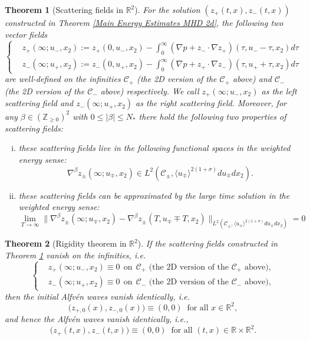 \documentclass[10pt,reqno]{amsart}
\numberwithin{equation}{section}
\newtheorem{theorem}{Theorem}[section]
\begin{document}
\begin{appendix}
	
	\begin{theorem}[Scattering fields in $\mathbb{R}^2$]\label{futurescatteringfields MHD 2d}
		For the solution $\left(z_+(t,x),z_-(t,x)\right)$ constructed in Theorem \ref{Main Energy Estimates MHD 2d}, the following two vector fields
		\begin{equation}\label{eq:def-sca4}
			\begin{cases}
				&\displaystyle z_+(\infty;u_-,x_2):=z_+(0,u_-,x_2)-\int_0^{\infty} \left(\nabla p+z_{-}\cdot\nabla z_{+}\right)(\tau,u_--\tau,x_2)d\tau\\
				&\displaystyle z_-(\infty;u_+,x_2):=z_-(0,u_+,x_2)-\int_0^{\infty} \left(\nabla p+z_{+}\cdot\nabla z_{-}\right)(\tau,u_++\tau,x_2)d\tau
			\end{cases}
		\end{equation}
		are well-defined on the infinities   $\mathcal{C}_+$  (the 2D version of the $\mathcal{C}_+$ above) and $\mathcal{C}_-$ (the 2D version of the  $\mathcal{C}_-$ above) respectively. We call  $z_+(\infty;u_-,x_2)$ as the left scattering field and $z_-(\infty;u_+,x_2)$ as the right  scattering field. Moreover, for any $\beta\in(\mathbb{Z}_{\geqslant 0})^2$ with $0\leqslant |\beta|\leqslant N_*$ there hold the following two properties of scattering fields:
		\begin{enumerate}[(i)]
	\item these scattering fields live in the following functional spaces in the weighted energy sense:
	\[\nabla^\beta z_\pm(\infty;u_\mp,x_2)\in L^2(\mathcal{C}_\pm,\langle u_\mp\rangle^{2(1+\sigma)}du_\mp dx_2).\]
	\item these scattering fields can be approximated by the large time solution in the weighted energy sense:
	\[\lim_{T\to\infty}\Big\|\nabla^{\beta} z_{\pm}(\infty;u_\mp,x_2)-\nabla^\beta z_{\pm}(T,u_\mp\mp T,x_2)\Big\|_{L^2(\mathcal{C}_\pm,\langle u_\mp\rangle^{2(1+\sigma)}du_\mp dx_2)}=0\]
		\end{enumerate}
	\end{theorem}
	
	
	
	
	\begin{theorem}[Rigidity theorem in $\mathbb{R}^2$]\label{rigidity theorem 1 2d}
		If the scattering fields  constructed in Theorem \ref{futurescatteringfields MHD 2d} vanish on the  infinities, i.e. 
		\begin{equation*}
			\begin{cases}
				& z_+(\infty;u_-,x_2)\equiv 0\ \ \text{on} \ \ \mathcal{C}_+\text{ (the 2D version of the  $\mathcal{C}_+$ above)},\\
				& z_-(\infty;u_+,x_2)\equiv 0\ \ \text{on} \ \ \mathcal{C}_-\text{ (the 2D version of the  $\mathcal{C}_-$ above)},
			\end{cases}
		\end{equation*}	
	then the initial Alfv\'en waves vanish identically, i.e.  \[\big(z_{+,0}(x),z_{-,0}(x)\big)\equiv(0,0)\ \text{ for all }x\in\mathbb{R}^2,\] and hence
	the Alfv\'en waves  vanish identically, i.e.,  \[\big(z_+(t,x),z_-(t,x)\big)\equiv(0,0)\  \text{ for all }(t,x)\in \mathbb{R}\times \mathbb{R}^2.\] 
	\end{theorem}
	

\end{appendix}
\end{document}
